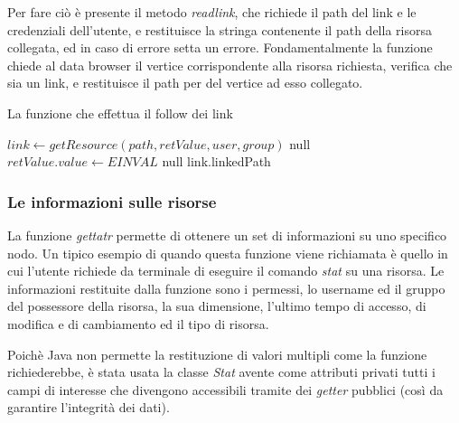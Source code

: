 Per fare ciò è presente il metodo \emph{readlink}, che richiede il path del link e le credenziali dell'utente, e restituisce la stringa contenente il path della risorsa collegata, ed in caso di errore setta un errore. Fondamentalmente la funzione chiede al data browser il vertice corrispondente alla risorsa richiesta, verifica che sia un link, e restituisce il path per del vertice ad esso collegato.

\begin{algorithm}
\begin{algorithmic}[5]
\caption{La funzione che effettua il follow dei link}
	\State $link \gets getResource(path, retValue, user, group)$
		\State \Return null
	\EndIf
		\State $retValue.value \gets EINVAL$
		\State \Return null
	\EndIf
	\Return link.linkedPath
\EndFunction
\end{algorithmic}
\end{algorithm}

\subsubsection{Le informazioni sulle risorse}
La funzione \emph{gettatr} permette di ottenere un set di informazioni su uno specifico nodo. Un tipico esempio di quando questa funzione viene richiamata è quello in cui l'utente richiede da terminale di eseguire il comando \emph{stat} su una risorsa. Le informazioni restituite dalla funzione sono i permessi, lo username ed il gruppo del possessore della risorsa, la sua dimensione, l'ultimo tempo di accesso, di modifica e di cambiamento ed il tipo di risorsa.

Poichè Java non permette la restituzione di valori multipli come la funzione richiederebbe, è stata usata la classe \emph{Stat} avente come attributi privati tutti i campi di interesse che divengono accessibili tramite dei \emph{getter} pubblici (così da garantire l'integrità dei dati).

